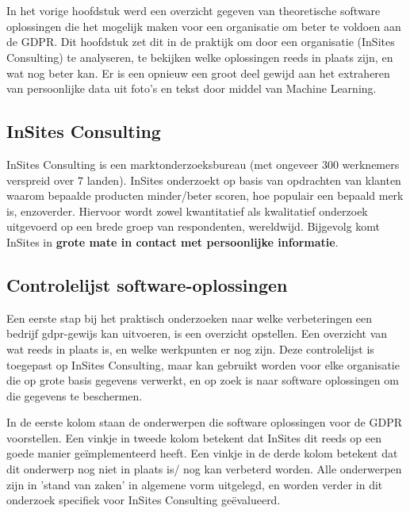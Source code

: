 
\chapter{}
\label{ch:methodologie}
In het vorige hoofdstuk werd een overzicht gegeven van theoretische software oplossingen die het mogelijk maken voor een organisatie om beter te voldoen aan de GDPR. Dit hoofdstuk zet dit in de praktijk om door een organisatie (InSites Consulting) te analyseren, te bekijken welke oplossingen reeds in plaats zijn, en wat nog beter kan. 
Er is een opnieuw een groot deel gewijd aan het extraheren van persoonlijke data uit foto's en tekst door middel van Machine Learning. 

\section{InSites Consulting}
InSites Consulting is een marktonderzoeksbureau (met ongeveer 300 werknemers verspreid over 7 landen). InSites onderzoekt op basis van opdrachten van klanten waarom bepaalde producten minder/beter scoren, hoe populair een bepaald merk is, enzoverder. Hiervoor wordt zowel kwantitatief als kwalitatief onderzoek uitgevoerd op een brede groep van respondenten, wereldwijd. Bijgevolg komt InSites in \textbf{grote mate in contact met persoonlijke informatie}. 

\section{Controlelijst software-oplossingen} 
Een eerste stap bij het praktisch onderzoeken naar welke verbeteringen een bedrijf gdpr-gewijs kan uitvoeren, is een overzicht opstellen. Een overzicht van wat reeds in plaats is, en welke werkpunten er nog zijn. Deze controlelijst is toegepast op InSites Consulting, maar kan gebruikt worden voor elke organisatie die op grote basis gegevens verwerkt, en op zoek is naar software oplossingen om die gegevens te beschermen. 

In de eerste kolom staan de onderwerpen die software oplossingen voor de GDPR voorstellen. Een vinkje in tweede kolom betekent dat InSites dit reeds op een goede manier geïmplementeerd heeft. Een vinkje in de derde kolom betekent dat dit onderwerp nog niet in plaats is/ nog kan verbeterd worden. Alle onderwerpen zijn in 'stand van zaken' in algemene vorm uitgelegd, en worden verder in dit onderzoek specifiek voor InSites Consulting geëvalueerd. 


